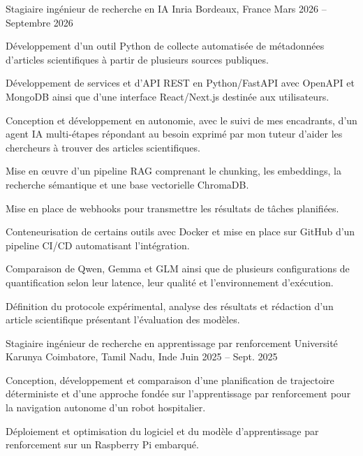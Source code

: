
\begin{cventries}
  \cventry
    {Stagiaire ingénieur de recherche en IA}
    {Inria}
    {Bordeaux, France}
    {Mars 2026 -- Septembre 2026}
    {
      \begin{cvitems}
        \item {Développement d’un outil Python de collecte automatisée de métadonnées d’articles scientifiques à partir de plusieurs sources publiques.}
        \item {Développement de services et d’API REST en Python/FastAPI avec OpenAPI et MongoDB ainsi que d’une interface React/Next.js destinée aux utilisateurs.}
        \item {Conception et développement en autonomie, avec le suivi de mes encadrants, d’un agent IA multi-étapes répondant au besoin exprimé par mon tuteur d’aider les chercheurs à trouver des articles scientifiques.}
        \item {Mise en œuvre d’un pipeline RAG comprenant le chunking, les embeddings, la recherche sémantique et une base vectorielle ChromaDB.}
        \item {Mise en place de webhooks pour transmettre les résultats de tâches planifiées.}
        \item {Conteneurisation de certains outils avec Docker et mise en place sur GitHub d’un pipeline CI/CD automatisant l’intégration.}
        \item {Comparaison de Qwen, Gemma et GLM ainsi que de plusieurs configurations de quantification selon leur latence, leur qualité et l’environnement d’exécution.}
        \item {Définition du protocole expérimental, analyse des résultats et rédaction d’un article scientifique présentant l’évaluation des modèles.}
      \end{cvitems}
    }

  \cventry
    {Stagiaire ingénieur de recherche en apprentissage par renforcement}
    {Université Karunya}
    {Coimbatore, Tamil Nadu, Inde}
    {Juin 2025 -- Sept. 2025}
    {
      \begin{cvitems}
        \item {Conception, développement et comparaison d’une planification de trajectoire déterministe et d’une approche fondée sur l’apprentissage par renforcement pour la navigation autonome d’un robot hospitalier.}
        \item {Déploiement et optimisation du logiciel et du modèle d’apprentissage par renforcement sur un Raspberry Pi embarqué.}
      \end{cvitems}
    }
\end{cventries}
